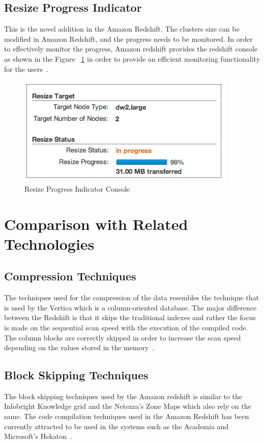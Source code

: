 	 \subsection{Resize Progress Indicator}
	  This is the novel addition in the Amazon Redshift. The clusters 
	  size can be modified in Amazon Redshift, and the progress 
	  needs to be monitored. In order to effectively monitor the progress, 
	  Amazon redshift provides the redshift console as shown in the Figure 
	  ~\ref{sa:ind} in order to provide an efficient monitoring 
	  functionality for 
	  the users~\cite{hid-sp18-412-Features_Amazon_Redshift}.
	\label{sa:ind}
	\begin{figure}[!ht]
	\centering\includegraphics[width=\columnwidth]
	{images/resize-indicator.png}
	\caption{Resize Progress Indicator 
	Console~\cite{hid-sp18-412-Features_Amazon_Redshift}}\label{sa:ind}
	\end{figure}
	
\section{Comparison with Related Technologies}
\label{s:comp}
	\subsection{Compression Techniques}
	The techniques used for the compression of the data resembles the 
	technique that is used by the Vertica which is a column-oriented 
	database. The major difference between the Redshift is that it 
	skips the traditional indexes and rather the focus is made on the 
	sequential scan speed with the execution of the compiled code. 
	The column blocks are correctly skipped in order to increase the 
	scan speed depending on the values stored in 
	the memory~\cite{hid-sp18-412_Gupta_2015_ARC}.
        
	\subsection{Block Skipping Techniques}
	 The block skipping techniques used by the Amazon redshift is similar 
	 to the Infobright Knowledge grid and the Netezza's Zone Maps which 
	 also rely on the same. The code compilation techniques used in the 
	 Amazon Redshift has been currently attracted to be used in the 
	 systems such as the Academia and 
	 Microsoft's Hekaton~\cite{hid-sp18-412_Gupta_2015_ARC}.
        
